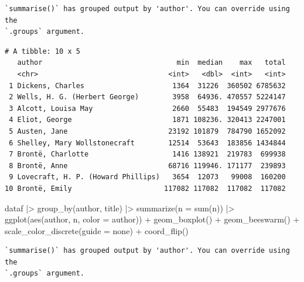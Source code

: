 \documentclass[
]{article}
\newenvironment{Shaded}{\begin{snugshade}}{\end{snugshade}}
\newcommand{\AttributeTok}[1]{\textcolor[rgb]{0.40,0.45,0.13}{#1}}
\newcommand{\FunctionTok}[1]{\textcolor[rgb]{0.28,0.35,0.67}{#1}}
\newcommand{\NormalTok}[1]{\textcolor[rgb]{0.00,0.23,0.31}{#1}}
\newcommand{\SpecialCharTok}[1]{\textcolor[rgb]{0.37,0.37,0.37}{#1}}
\newcommand{\StringTok}[1]{\textcolor[rgb]{0.13,0.47,0.30}{#1}}
\begin{document}
\begin{verbatim}
`summarise()` has grouped output by 'author'. You can override using the
`.groups` argument.
\end{verbatim}

\begin{verbatim}
# A tibble: 10 x 5
   author                                min  median    max   total
   <chr>                               <int>   <dbl>  <int>   <int>
 1 Dickens, Charles                     1364  31226  360502 6785632
 2 Wells, H. G. (Herbert George)        3958  64936. 470557 5224147
 3 Alcott, Louisa May                   2660  55483  194549 2977676
 4 Eliot, George                        1871 108236. 320413 2247001
 5 Austen, Jane                        23192 101879  784790 1652092
 6 Shelley, Mary Wollstonecraft        12514  53643  183856 1434844
 7 Brontë, Charlotte                    1416 138921  219783  699938
 8 Brontë, Anne                        68716 119946. 171177  239893
 9 Lovecraft, H. P. (Howard Phillips)   3654  12073   99008  160200
10 Brontë, Emily                      117082 117082  117082  117082
\end{verbatim}

\begin{Shaded}
\begin{Highlighting}[]
\NormalTok{dataf }\SpecialCharTok{|\textgreater{}} 
    \FunctionTok{group\_by}\NormalTok{(author, title) }\SpecialCharTok{|\textgreater{}} 
    \FunctionTok{summarize}\NormalTok{(}\AttributeTok{n =} \FunctionTok{sum}\NormalTok{(n)) }\SpecialCharTok{|\textgreater{}} 
    \FunctionTok{ggplot}\NormalTok{(}\FunctionTok{aes}\NormalTok{(author, n, }\AttributeTok{color =}\NormalTok{ author)) }\SpecialCharTok{+}
    \FunctionTok{geom\_boxplot}\NormalTok{() }\SpecialCharTok{+}
    \FunctionTok{geom\_beeswarm}\NormalTok{() }\SpecialCharTok{+}
    \FunctionTok{scale\_color\_discrete}\NormalTok{(}\AttributeTok{guide =} \StringTok{\textquotesingle{}none\textquotesingle{}}\NormalTok{) }\SpecialCharTok{+}
    \FunctionTok{coord\_flip}\NormalTok{()}
\end{Highlighting}
\end{Shaded}

\begin{verbatim}
`summarise()` has grouped output by 'author'. You can override using the
`.groups` argument.
\end{verbatim}
\end{document}
